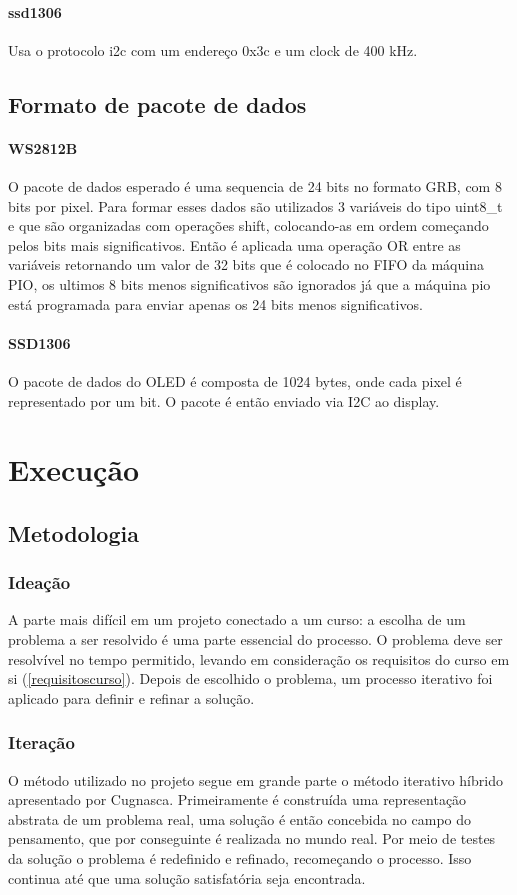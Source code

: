 \documentclass[12pt]{article}
\begin{document}
\paragraph{ssd1306} Usa o protocolo i2c com um endereço 0x3c e um clock de 400 kHz.

\subsection{Formato de pacote de dados}
\paragraph{WS2812B} O pacote de dados esperado é uma sequencia de 24 bits no formato GRB, com 8 bits por pixel. Para formar esses dados são utilizados 3 variáveis do tipo uint8\_t e que são organizadas com operações shift, colocando-as em ordem começando pelos bits mais significativos. Então é aplicada uma operação OR entre as variáveis retornando um valor de 32 bits que é colocado no FIFO da máquina PIO, os ultimos 8 bits menos significativos são ignorados já que a máquina pio está programada para enviar apenas os 24 bits menos significativos.
\paragraph{SSD1306} O pacote de dados do OLED é composta de 1024 bytes, onde cada pixel é representado por um bit. O pacote é então enviado via I2C ao display.

\section{Execução}

\subsection{Metodologia}
\subsubsection{Ideação}
A parte mais difícil em um projeto conectado a um curso: a escolha de um problema a ser resolvido é uma parte essencial do processo. O problema deve ser resolvível no tempo permitido, levando em consideração os requisitos do curso em si (\ref{requisitoscurso}). Depois de escolhido o problema, um processo iterativo foi aplicado para definir e refinar a solução.
\subsubsection{Iteração} 
O método utilizado no projeto segue em grande parte o método iterativo híbrido apresentado por Cugnasca\cite{cugnasca}. Primeiramente é construída uma representação abstrata de um problema real, uma solução é então concebida no campo do pensamento, que por conseguinte é realizada no mundo real. Por meio de testes da solução o problema é redefinido e refinado, recomeçando o processo. Isso continua até que uma solução satisfatória seja encontrada.
\end{document}
